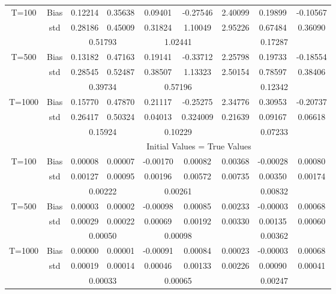 \documentclass[a4paper,12pt,times,numbered,print,index]{report}
\numberwithin{equation}{section}
\begin{document}
\begin{table}[htbp]
\begin{adjustbox}{max width=0.8\textwidth}
\begin{tabular}{ccccccccc}
		\midrule
		\multirow{3}[1]{*}{T=100} & Bias  & 0.12214 & 0.35638 & 0.09401 & -0.27546 & 2.40099 & 0.19899 & -0.10567 \\
		& std   & 0.28186 & 0.45009 & 0.31824 & 1.10049 & 2.95226 & 0.67484 & 0.36090 \\
		&       & \multicolumn{2}{c}{0.51793} & \multicolumn{2}{c}{1.02441} & \multicolumn{3}{c}{0.17287} \\
		\multirow{3}[0]{*}{T=500} & Bias  & 0.13182 & 0.47163 & 0.19141 & -0.33712 & 2.25798 & 0.19733 & -0.18554 \\
		& std   & 0.28545 & 0.52487 & 0.38507 & 1.13323 & 2.50154 & 0.78597 & 0.38406 \\
		&       & \multicolumn{2}{c}{0.39734} & \multicolumn{2}{c}{0.57196} & \multicolumn{3}{c}{0.12342} \\
		\multirow{3}[1]{*}{T=1000} & Bias  & 0.15770 & 0.47870 & 0.21117 & -0.25275 & 2.34776 & 0.30953 & -0.20737 \\
		& std   & 0.26417 & 0.50324 & 0.04013 & 0.324009 & 0.21639 & 0.09167 & 0.06618 \\
		&       & \multicolumn{2}{c}{0.15924} & \multicolumn{2}{c}{0.10229} & \multicolumn{3}{c}{0.07233} \\
		\midrule
		&       & \multicolumn{7}{c}{Initial Values = True Values} \\
		\midrule
		\multirow{3}[1]{*}{T=100} & Bias  & 0.00008 & 0.00007 & -0.00170 & 0.00082 & 0.00368 & -0.00028 & 0.00080 \\
		& std   & 0.00127 & 0.00095 & 0.00196 & 0.00572 & 0.00735 & 0.00350 & 0.00174 \\
		&       & \multicolumn{2}{c}{0.00222} & \multicolumn{2}{c}{0.00261} & \multicolumn{3}{c}{0.00832} \\
		\multirow{3}[0]{*}{T=500} & Bias  & 0.00003 & 0.00002 & -0.00098 & 0.00085 & 0.00233 & -0.00003 & 0.00068 \\
		& std   & 0.00029 & 0.00022 & 0.00069 & 0.00192 & 0.00330 & 0.00135 & 0.00060 \\
		&       & \multicolumn{2}{c}{0.00050} & \multicolumn{2}{c}{0.00098} & \multicolumn{3}{c}{0.00362} \\
		\multirow{3}[1]{*}{T=1000} & Bias  & 0.00000 & 0.00001 & -0.00091 & 0.00084 & 0.00023 & -0.00003 & 0.00068 \\
		& std   & 0.00019 & 0.00014 & 0.00046 & 0.00133 & 0.00226 & 0.00090 & 0.00041 \\
		&       & \multicolumn{2}{c}{0.00033} & \multicolumn{2}{c}{0.00065} & \multicolumn{3}{c}{0.00247} \\
		\bottomrule
		\bottomrule
    \end{tabular}%
	\end{adjustbox}
	\label{init values}%
\end{table}%
\end{document}
